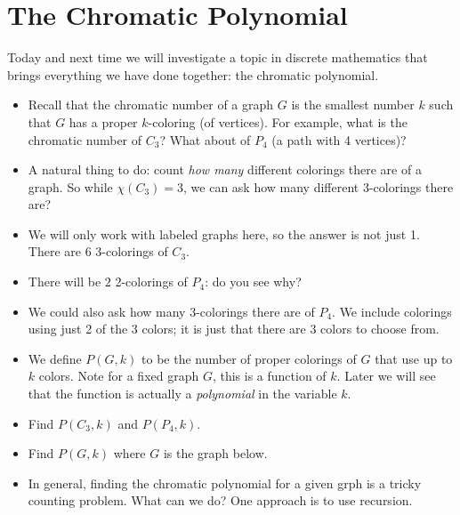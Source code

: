\documentclass[12pt]{article}
\theoremstyle{plain}
\theoremstyle{definition}
\theoremstyle{remark}
\newcommand{\vtx}[2]{node[fill,circle,inner sep=0pt, minimum size=4pt,label=#1:#2]{}}
\newcommand{\va}[1]{\vtx{above}{#1}}
\newcommand{\vb}[1]{\vtx{below}{#1}}
\newcommand{\vr}[1]{\vtx{right}{#1}}
\newcommand{\todayis}[1]{\clearpage{\rhead{\footnotesize #1}}}
\begin{document}
\todayis{Monday, November 12}

\section*{The Chromatic Polynomial}

Today and next time we will investigate a topic in discrete mathematics that brings everything we have done together: the chromatic polynomial.

\begin{itemize}
  \item Recall that the chromatic number of a graph $G$ is the smallest number $k$ such that $G$ has a proper $k$-coloring (of vertices).  For example, what is the chromatic number of $C_3$?  What about of $P_4$ (a path with 4 vertices)?
  \item A natural thing to do: count \emph{how many} different colorings there are of a graph.  So while $\chi(C_3) = 3$, we can ask how many different 3-colorings there are?
  \item We will only work with labeled graphs here, so the answer is not just 1.  There are 6 3-colorings of $C_3$.
  \item There will be $2$ 2-colorings of $P_4$: do you see why?
  \item We could also ask how many 3-colorings there are of $P_4$.  We include colorings using just 2 of the 3 colors; it is just that there are 3 colors to choose from.
  \item We define $P(G,k)$ to be the number of proper colorings of $G$ that use up to $k$ colors.  Note for a fixed graph $G$, this is a function of $k$.  Later we will see that the function is actually a \emph{polynomial} in the variable $k$.
  \item Find $P(C_3,k)$ and $P(P_4,k)$.
  \item Find $P(G,k)$ where $G$ is the graph below.

  \begin{center}
    {\footnotesize
    }
  \end{center}

  \item In general, finding the chromatic polynomial for a given grph is a tricky counting problem.  What can we do?  One approach is to use recursion.


\end{itemize}
\end{document}
